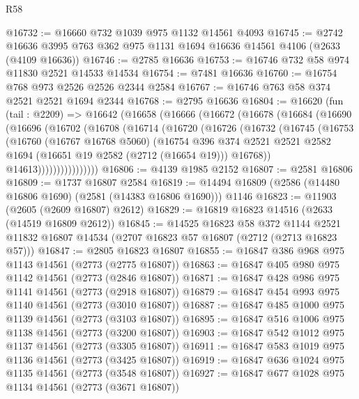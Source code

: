 \begin{lexlean}{R58}
\begin{coremodule}
@16732 := @16660 @732 @1039 @975 @1132 @14561 @4093
@16745 := @2742 @16636 @3995 @763 @362 @975 @1131 @1694 @16636 @14561 @4106 (@2633 (@4109 @16636))
@16746 := @2785 @16636
@16753 := @16746 @732 @58 @974 @11830 @2521 @14533 @14534
@16754 := @7481 @16636
@16760 := @16754 @768 @973 @2526 @2526 @2344 @2584
@16767 := @16746 @763 @58 @374 @2521 @2521 @1694 @2344
@16768 := @2795 @16636
@16804 := @16620
    (fun (tail : @2209) =>
    @16642
      (@16658
        (@16666
          (@16672
            (@16678
              (@16684
                (@16690
                  (@16696
                    (@16702
                      (@16708
                        (@16714
                          (@16720
                            (@16726
                              (@16732
                                (@16745
                                  (@16753
                                    (@16760
                                      (@16767 @16768 @5060)
                                      (@16754
                                        @396
                                        @374
                                        @2521
                                        @2521
                                        @2582
                                        @1694
                                        (@16651 @19 @2582 (@2712 (@16654 @19)))
                                        @16768))
                                    @14613))))))))))))))))
@16806 := @4139 @1985 @2152
@16807 := @2581 @16806
@16809 := @1737 @16807 @2584
@16819 := @14494 @16809 (@2586 (@14480 @16806 @1690) (@2581 (@14383 @16806 @1690))) @1146
@16823 := @11903 (@2605 (@2609 @16807) @2612)
@16829 := @16819 @16823 @14516 (@2633 (@14519 @16809 @2612))
@16845 := @14525
    @16823
    @58
    @372
    @1144
    @2521
    @11832
    @16807
    @14534
    (@2707 @16823 @57 @16807 (@2712 (@2713 @16823 @57)))
@16847 := @2805 @16823 @16807
@16855 := @16847 @386 @968 @975 @1143 @14561 (@2773 (@2775 @16807))
@16863 := @16847 @405 @980 @975 @1142 @14561 (@2773 (@2846 @16807))
@16871 := @16847 @428 @986 @975 @1141 @14561 (@2773 (@2918 @16807))
@16879 := @16847 @454 @993 @975 @1140 @14561 (@2773 (@3010 @16807))
@16887 := @16847 @485 @1000 @975 @1139 @14561 (@2773 (@3103 @16807))
@16895 := @16847 @516 @1006 @975 @1138 @14561 (@2773 (@3200 @16807))
@16903 := @16847 @542 @1012 @975 @1137 @14561 (@2773 (@3305 @16807))
@16911 := @16847 @583 @1019 @975 @1136 @14561 (@2773 (@3425 @16807))
@16919 := @16847 @636 @1024 @975 @1135 @14561 (@2773 (@3548 @16807))
@16927 := @16847 @677 @1028 @975 @1134 @14561 (@2773 (@3671 @16807))

\end{coremodule}
\end{lexlean}
